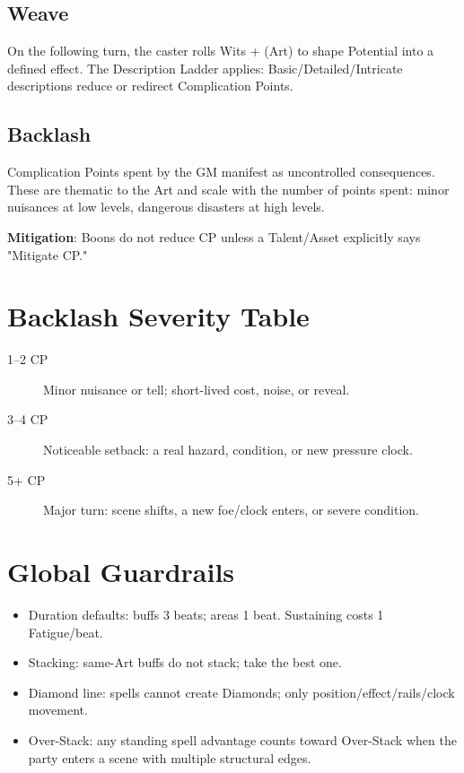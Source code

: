 \subsection{Weave}
On the following turn, the caster rolls Wits + (Art) to shape Potential into a defined effect. The Description Ladder applies: Basic/Detailed/Intricate descriptions reduce or redirect Complication Points.

\subsection{Backlash}
Complication Points spent by the GM manifest as uncontrolled consequences. These are thematic to the Art and scale with the number of points spent: minor nuisances at low levels, dangerous disasters at high levels.

\textbf{Mitigation}: Boons do not reduce CP unless a Talent/Asset explicitly says "Mitigate CP."

\section{Backlash Severity Table}

\begin{description}
\item[1--2 CP] Minor nuisance or tell; short-lived cost, noise, or reveal.
\item[3--4 CP] Noticeable setback: a real hazard, condition, or new pressure clock.
\item[5+ CP] Major turn: scene shifts, a new foe/clock enters, or severe condition.
\end{description}

\section{Global Guardrails}

\begin{itemize}
\item Duration defaults: buffs 3 beats; areas 1 beat. Sustaining costs 1 Fatigue/beat.
\item Stacking: same-Art buffs do not stack; take the best one.
\item Diamond line: spells cannot create Diamonds; only position/effect/rails/clock movement.
\item Over-Stack: any standing spell advantage counts toward Over-Stack when the party enters a scene with multiple structural edges.
\end{itemize}


